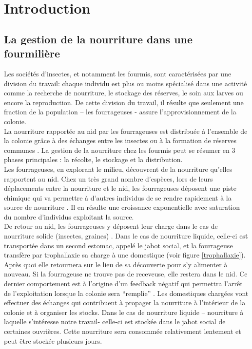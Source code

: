 \chapter{Introduction}

\section{La gestion de la nourriture dans une fourmilière}

Les sociétés d'insectes, et notamment les fourmis, sont caractérisées par une division du travail: chaque individu est plus ou moins spécialisé dans une activité comme la recherche de nourriture, le stockage des réserves, le soin aux larves ou encore la reproduction. De cette division du travail, il résulte que seulement une fraction de la population – les fourrageuses - assure l'approvisionnement de la colonie.\\

La nourriture rapportée au nid par les fourrageuses est distribuée à l'ensemble de la colonie grâce à des échanges entre les insectes ou à la formation de réserves communes \citep{holldobler_ants_1990,passera_les_2005}. La gestion de la nourriture chez les fourmis peut se résumer en 3 phases principales : la récolte, le stockage et la distribution.\\

Les fourrageuses, en explorant le milieu, découvrent de la nourriture qu'elles rapportent au nid. Chez un très grand nombre d'espèces, lors de leurs déplacements entre la nourriture et le nid, les fourrageuses déposent une piste chimique qui va permettre à d'autres individus de se rendre rapidement à la source de nourriture \citep{camazine_self-organization_2003}. Il en résulte une croissance exponentielle avec saturation du nombre d'individus exploitant la source.\\

De retour au nid, les fourrageuses y déposent leur charge dans le cas de nourriture solide (insectes, graines) \citep{reyes-lopez_food_2002}. Dans le cas de nourriture liquide, celle-ci est transportée dans un second estomac, appelé le jabot social, et la fourrageuse transfère par trophallaxie sa charge à une domestique (voir figure \ref{trophallaxie}). Après quoi elle retournera sur le lieu de sa découverte pour s'y alimenter à nouveau. Si la fourrageuse ne trouve pas de receveuse, elle restera dans le nid. Ce dernier comportement est à l'origine d'un feedback négatif qui permettra l'arrêt de l'exploitation lorsque la colonie sera ``remplie'' \citep{mailleux_impact_2010}. Les domestiques chargées vont effectuer des échanges qui contribuent à propager la nourriture à l'intérieur de la colonie et à organiser les stocks. Dans le cas de nourriture liquide – nourriture à laquelle s'intéresse notre travail- celle-ci est stockée dans le jabot social de certaines ouvrières. Cette nourriture sera consommée relativement lentement et peut être stockée plusieurs jours. \\

